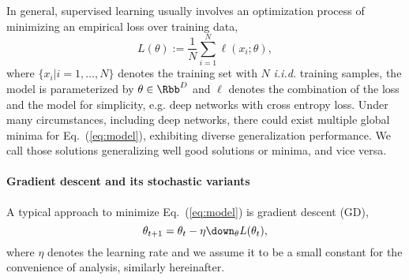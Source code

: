 \documentclass{article}
\begin{document}
In general, supervised learning usually involves an optimization process of minimizing an empirical loss over training data,
\begin{equation}
    L(\theta) := \frac{1}{N} \sum_{i=1}^N \ell(x_i; \theta),
    \label{eq:model}
\end{equation}
where $\{x_i | i=1,\dots,N\}$ denotes the training set with $N$ \emph{i.i.d.} training samples, the model is parameterized by $\theta \in \Rbb^D $ and $\ell$ denotes the combination of the loss and the model for simplicity, e.g. deep networks with cross entropy loss.
Under many circumstances, including deep networks, there could exist multiple global minima for Eq.~(\ref{eq:model}), exhibiting diverse generalization performance.
We call those solutions generalizing well good solutions or minima, and vice versa.

\paragraph{Gradient descent and its stochastic variants}
A typical approach to minimize Eq.~(\ref{eq:model}) is gradient descent (GD),
\begin{equation}
    \theta_{t+1} = \theta_t - \eta \down_{\theta}L(\theta_t),
    \label{eq:gd}
\end{equation}
where $\eta$ denotes the learning rate and we assume it to be a small constant for the convenience of analysis, similarly hereinafter.
\end{document}
